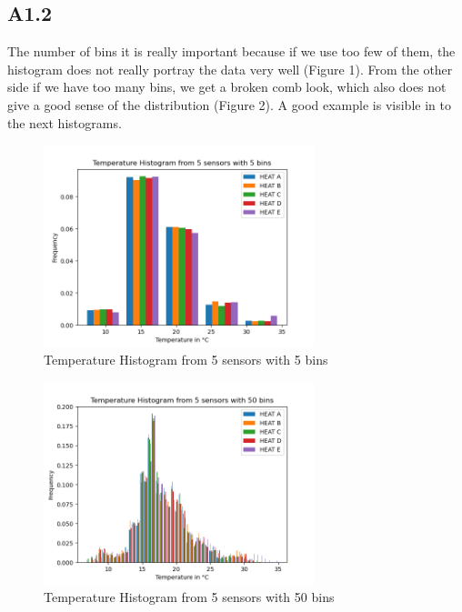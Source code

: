 \documentclass[a4paper,12pt]{article}
\begin{document}
 \subsection{A1.2}
The number of bins it is really important because if we use too few of them, the histogram does not really portray the data very well (Figure 1). From the other side if we have too many bins, we get a broken comb look, which also does not give a good sense of the distribution (Figure 2). A good example is visible in to the next histograms.
  \begin{figure}[H] 
	\centering
	\includegraphics[width=0.7\textwidth]{Temperature Histogram from 5 sensors with 5 bins.png}
	\caption{Temperature Histogram from 5 sensors with 5 bins\cite{Maiullari2020}}
  \end{figure}
  \begin{figure}[H] 
	\centering
	\includegraphics[width=0.7\textwidth]{Temperature Histogram from 5 sensors with 50 bins.png}
	\caption{Temperature Histogram from 5 sensors with 50 bins\cite{Maiullari2020}}
  \end{figure}
\end{document}
